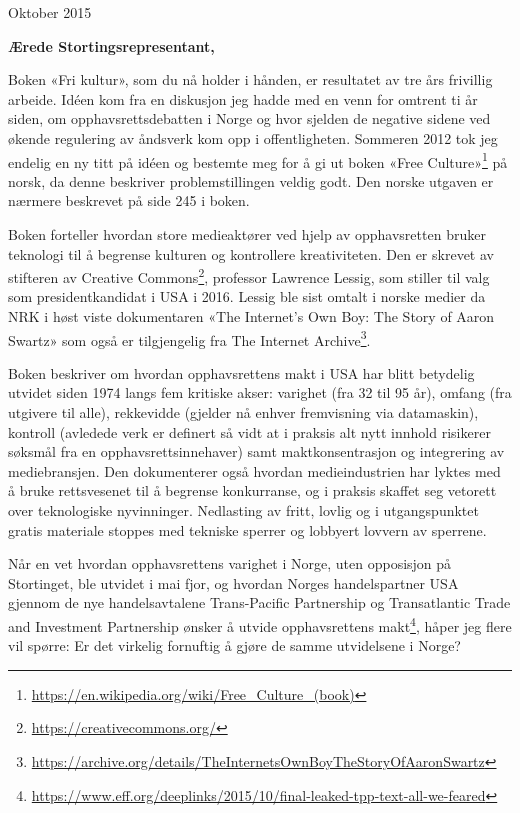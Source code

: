 \documentclass[a4paper, 11pt, norsk]{article}
\begin{document}
\begin{flushright} Oktober 2015 \end{flushright}

{\bf Ærede Stortingsrepresentant,}

Boken «Fri kultur», som du nå holder i hånden, er resultatet av tre
års frivillig arbeide.  Idéen kom fra en diskusjon jeg hadde med en
venn for omtrent ti år siden, om opphavsrettsdebatten i Norge og hvor
sjelden de negative sidene ved økende regulering av åndsverk kom opp i
offentligheten.  Sommeren 2012 tok jeg endelig en ny titt på idéen og
bestemte meg for å gi ut boken «Free
  Culture»\footnote{\url{https://en.wikipedia.org/wiki/Free_Culture_(book)}}
på norsk, da denne beskriver problemstillingen veldig godt.  Den
norske utgaven er nærmere beskrevet på side 245 i boken.

Boken forteller hvordan store medieaktører ved hjelp av opphavsretten
bruker teknologi til å begrense kulturen og kontrollere kreativiteten.
Den er skrevet av stifteren av Creative
Commons\footnote{\url{https://creativecommons.org/}}, professor
Lawrence Lessig, som stiller til valg som presidentkandidat i USA i
2016.  Lessig ble sist omtalt i norske medier da NRK i høst viste
dokumentaren «The Internet's Own Boy: The Story of Aaron Swartz» som
også er tilgjengelig fra The Internet
Archive\footnote{\url{https://archive.org/details/TheInternetsOwnBoyTheStoryOfAaronSwartz}}.

Boken beskriver om hvordan opphavsrettens makt i USA har blitt
betydelig utvidet siden 1974 langs fem kritiske akser: varighet (fra
32 til 95 år), omfang (fra utgivere til alle), rekkevidde (gjelder nå
enhver fremvisning via datamaskin), kontroll (avledede verk er
definert så vidt at i praksis alt nytt innhold risikerer søksmål fra
en opphavsrettsinnehaver) samt maktkonsentrasjon og integrering av
mediebransjen.  Den dokumenterer også hvordan medieindustrien har
lyktes med å bruke rettsvesenet til å begrense konkurranse, og i
praksis skaffet seg vetorett over teknologiske nyvinninger. Nedlasting
av fritt, lovlig og i utgangspunktet gratis materiale stoppes med
tekniske sperrer og lobbyert lovvern av sperrene.

Når en vet hvordan opphavsrettens varighet i Norge, uten opposisjon på
Stortinget, ble utvidet i mai fjor, og hvordan Norges handelspartner
USA gjennom de nye handelsavtalene Trans-Pacific Partnership og
Transatlantic Trade and Investment Partnership ønsker å utvide
opphavsrettens makt\footnote{\url{https://www.eff.org/deeplinks/2015/10/final-leaked-tpp-text-all-we-feared}},
håper jeg flere vil spørre: Er det virkelig fornuftig å gjøre de samme
utvidelsene i Norge?
\end{document}
